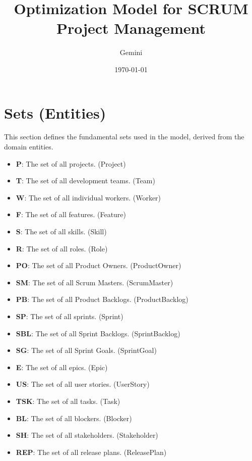 \documentclass[11pt]{article}
\title{\textbf{Optimization Model for SCRUM Project Management}}
\author{Gemini}
\date{\today}
\begin{document}
\maketitle
\thispagestyle{empty}

\newpage
\tableofcontents
\thispagestyle{empty}

\newpage
\setcounter{page}{1}

\section{Sets (Entities)}
This section defines the fundamental sets used in the model, derived from the domain entities.
\begin{itemize}
    \item \textbf{P}: The set of all projects. (Project)
    \item \textbf{T}: The set of all development teams. (Team)
    \item \textbf{W}: The set of all individual workers. (Worker)
    \item \textbf{F}: The set of all features. (Feature)
    \item \textbf{S}: The set of all skills. (Skill)
    \item \textbf{R}: The set of all roles. (Role)
    \item \textbf{PO}: The set of all Product Owners. (ProductOwner)
    \item \textbf{SM}: The set of all Scrum Masters. (ScrumMaster)
    \item \textbf{PB}: The set of all Product Backlogs. (ProductBacklog)
    \item \textbf{SP}: The set of all sprints. (Sprint)
    \item \textbf{SBL}: The set of all Sprint Backlogs. (SprintBacklog)
    \item \textbf{SG}: The set of all Sprint Goals. (SprintGoal)
    \item \textbf{E}: The set of all epics. (Epic)
    \item \textbf{US}: The set of all user stories. (UserStory)
    \item \textbf{TSK}: The set of all tasks. (Task)
    \item \textbf{BL}: The set of all blockers. (Blocker)
    \item \textbf{SH}: The set of all stakeholders. (Stakeholder)
    \item \textbf{REP}: The set of all release plans. (ReleasePlan)
\end{itemize}
\end{document}
